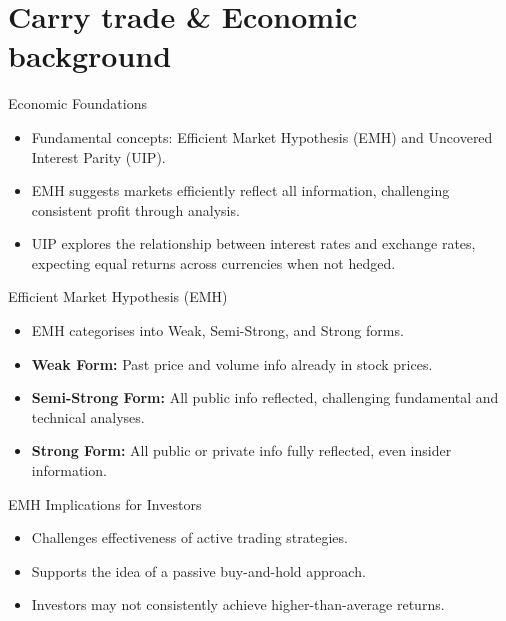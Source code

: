 \documentclass{beamer}
\begin{document}
\section{Carry trade \& Economic background}

\begin{frame}{Economic Foundations}
    \begin{itemize}
        \item Fundamental concepts: Efficient Market Hypothesis (EMH) and Uncovered Interest Parity (UIP).
        \item EMH suggests markets efficiently reflect all information, challenging consistent profit through analysis.
        \item UIP explores the relationship between interest rates and exchange rates, expecting equal returns across currencies when not hedged.
    \end{itemize}
\end{frame}

\begin{frame}{Efficient Market Hypothesis (EMH)}
    \begin{itemize}
        \item EMH categorises into Weak, Semi-Strong, and Strong forms.
        \item \textbf{Weak Form:} Past price and volume info already in stock prices.
        \item \textbf{Semi-Strong Form:} All public info reflected, challenging fundamental and technical analyses.
        \item \textbf{Strong Form:} All public or private info fully reflected, even insider information.
    \end{itemize}
\end{frame}

\begin{frame}{EMH Implications for Investors}
    \begin{itemize}
        \item Challenges effectiveness of active trading strategies.
        \item Supports the idea of a passive buy-and-hold approach.
        \item Investors may not consistently achieve higher-than-average returns.
    \end{itemize}
\end{frame}
\end{document}
